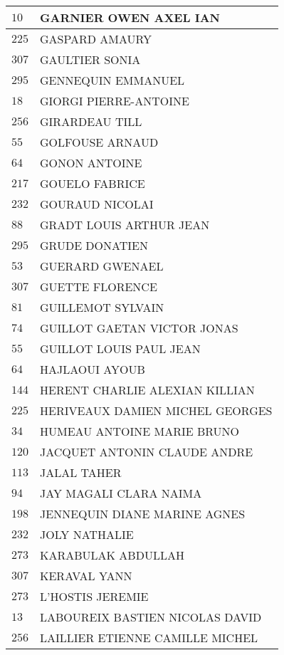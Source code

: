 \begin{xltabular}{\linewidth}{|l|X|}
    $10$ & GARNIER OWEN AXEL IAN \\
    \hline
    $225$ & GASPARD AMAURY \\
    \hline
    $307$ & GAULTIER SONIA \\
    \hline
    $295$ & GENNEQUIN EMMANUEL \\
    \hline
    $18$ & GIORGI PIERRE-ANTOINE \\
    \hline
    $256$ & GIRARDEAU TILL \\
    \hline
    $55$ & GOLFOUSE ARNAUD \\
    \hline
    $64$ & GONON ANTOINE \\
    \hline
    $217$ & GOUELO FABRICE \\
    \hline
    $232$ & GOURAUD NICOLAI \\
    \hline
    $88$ & GRADT LOUIS ARTHUR JEAN \\
    \hline
    $295$ & GRUDE DONATIEN \\
    \hline
    $53$ & GUERARD GWENAEL \\
    \hline
    $307$ & GUETTE FLORENCE \\
    \hline
    $81$ & GUILLEMOT SYLVAIN \\
    \hline
    $74$ & GUILLOT GAETAN VICTOR JONAS \\
    \hline
    $55$ & GUILLOT LOUIS PAUL JEAN \\
    \hline
    $64$ & HAJLAOUI AYOUB \\
    \hline
    $144$ & HERENT CHARLIE ALEXIAN KILLIAN \\
    \hline
    $225$ & HERIVEAUX DAMIEN MICHEL GEORGES \\
    \hline
    $34$ & HUMEAU ANTOINE MARIE BRUNO \\
    \hline
    $120$ & JACQUET ANTONIN CLAUDE ANDRE \\
    \hline
    $113$ & JALAL TAHER \\
    \hline
    $94$ & JAY MAGALI CLARA NAIMA \\
    \hline
    $198$ & JENNEQUIN DIANE MARINE AGNES \\
    \hline
    $232$ & JOLY NATHALIE \\
    \hline
    $273$ & KARABULAK ABDULLAH \\
    \hline
    $307$ & KERAVAL YANN \\
    \hline
    $273$ & L'HOSTIS JEREMIE \\
    \hline
    $13$ & LABOUREIX BASTIEN NICOLAS DAVID \\
    \hline
    $256$ & LAILLIER ETIENNE CAMILLE MICHEL \\

\end{xltabular}

